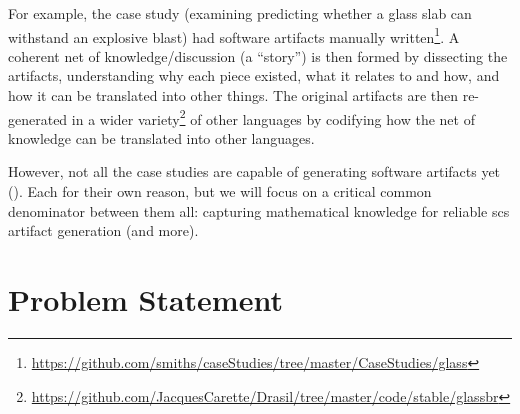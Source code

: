 For example, the  case study (examining predicting whether a glass
slab can withstand an explosive blast) had software artifacts manually
written\footnote{\url{https://github.com/smiths/caseStudies/tree/master/CaseStudies/glass}}.
A coherent net of knowledge/discussion (a ``story'') is then formed by
dissecting the artifacts, understanding why each piece existed, what it relates
to and how, and how it can be translated into other things. The original
artifacts are then re-generated in a wider
variety\footnote{\url{https://github.com/JacquesCarette/Drasil/tree/master/code/stable/glassbr}}
of other languages by codifying how the net of knowledge can be translated into
other languages.

However, not all the case studies are capable of generating software artifacts
yet (). Each for their own reason, but we will focus
on a critical common denominator between them all: capturing mathematical
knowledge for reliable \acs{scs} artifact generation (and more).

\section{Problem Statement}
\label{sec:intro:problemStatement}

\iffalse
      Drasil has de-duplicated knowledge across \acs{scs} artifacts relevant to
      specifications and code. Through codifying knowledge and creating coherent
      ``stories'', Drasil is able to generate a wide variety of software
      artifacts (e.g., \acs{oo} programs via \acs{gool} with guided usage via
      Makefiles, and requirements specifications [HTML and TeX]). This codified
      knowledge was de-duplicated from an originating set of artifacts via
      bottom-up gathering, however, we should be able to use the same knowledge
      to generate more artifacts in different languages, flavours, and with more
      options. However, each desired artifact language has its own way of
      encoding information (such as mathematical expressions). This leaves us
      needing to teach Drasil more about the targeted languages (and, at times,
      about the existing codified knowledge) in order to reliably generate
      usable artifacts.
\fi

